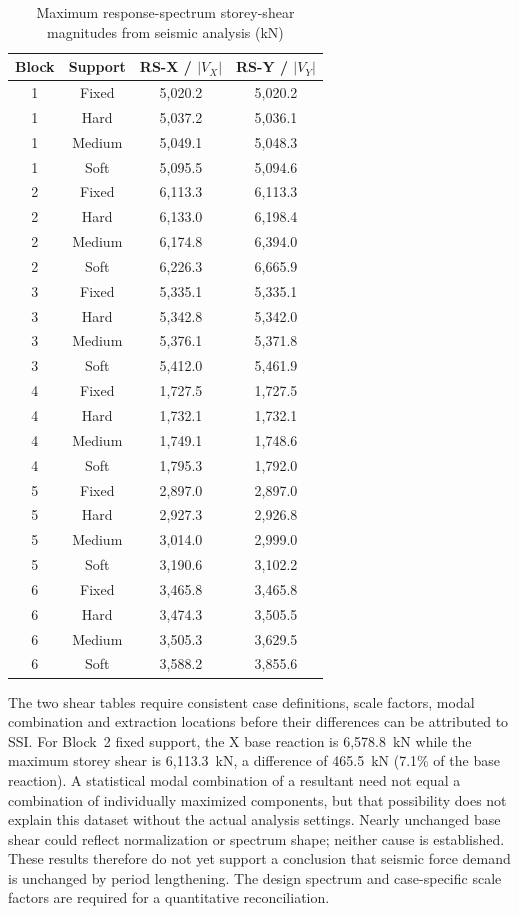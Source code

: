 \begin{table}[!htbp]
\fontsize{11}{13}\selectfont\setlength{\tabcolsep}{4pt}
\centering
\fontsize{11}{13}\selectfont\setlength{\tabcolsep}{4pt}\renewcommand{\arraystretch}{0.95}
\caption{Maximum response-spectrum storey-shear magnitudes from seismic analysis (kN)}\label{tab:seq54_storyshear}
\begin{tabular*}{\linewidth}{@{\extracolsep{\fill}}cccc@{}}
\toprule
Block & Support & RS-X / $|V_X|$ & RS-Y / $|V_Y|$\\
\midrule
1 & Fixed & 5,020.2 & 5,020.2 \\
1 & Hard & 5,037.2 & 5,036.1 \\
1 & Medium & 5,049.1 & 5,048.3 \\
1 & Soft & 5,095.5 & 5,094.6 \\
2 & Fixed & 6,113.3 & 6,113.3 \\
2 & Hard & 6,133.0 & 6,198.4 \\
2 & Medium & 6,174.8 & 6,394.0 \\
2 & Soft & 6,226.3 & 6,665.9 \\
3 & Fixed & 5,335.1 & 5,335.1 \\
3 & Hard & 5,342.8 & 5,342.0 \\
3 & Medium & 5,376.1 & 5,371.8 \\
3 & Soft & 5,412.0 & 5,461.9 \\
4 & Fixed & 1,727.5 & 1,727.5 \\
4 & Hard & 1,732.1 & 1,732.1 \\
4 & Medium & 1,749.1 & 1,748.6 \\
4 & Soft & 1,795.3 & 1,792.0 \\
5 & Fixed & 2,897.0 & 2,897.0 \\
5 & Hard & 2,927.3 & 2,926.8 \\
5 & Medium & 3,014.0 & 2,999.0 \\
5 & Soft & 3,190.6 & 3,102.2 \\
6 & Fixed & 3,465.8 & 3,465.8 \\
6 & Hard & 3,474.3 & 3,505.5 \\
6 & Medium & 3,505.3 & 3,629.5 \\
6 & Soft & 3,588.2 & 3,855.6 \\
\bottomrule
\end{tabular*}
\end{table}

The two shear tables require consistent case definitions, scale factors, modal combination and extraction locations before their differences can be attributed to SSI. For Block~2 fixed support, the X base reaction is 6,578.8~kN while the maximum storey shear is 6,113.3~kN, a difference of 465.5~kN (7.1\% of the base reaction). A statistical modal combination of a resultant need not equal a combination of individually maximized components, but that possibility does not explain this dataset without the actual analysis settings. Nearly unchanged base shear could reflect normalization or spectrum shape; neither cause is established. These results therefore do not yet support a conclusion that seismic force demand is unchanged by period lengthening. The design spectrum and case-specific scale factors are required for a quantitative reconciliation.

